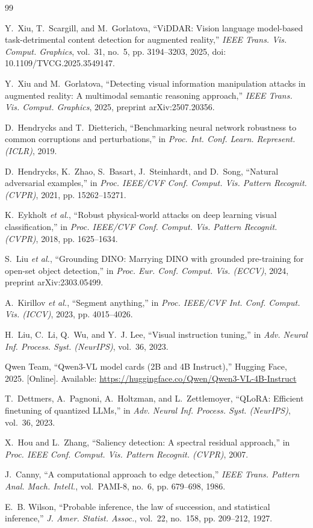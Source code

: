 \documentclass[journal,onecolumn]{IEEEtran}
\begin{document}
\begin{thebibliography}{99}

Y.~Xiu, T.~Scargill, and M.~Gorlatova, ``{ViDDAR}: Vision language model-based task-detrimental
content detection for augmented reality,'' \emph{IEEE Trans. Vis. Comput. Graphics}, vol.~31, no.~5,
pp. 3194--3203, 2025, doi: 10.1109/TVCG.2025.3549147.

Y.~Xiu and M.~Gorlatova, ``Detecting visual information manipulation attacks in augmented reality: A
multimodal semantic reasoning approach,'' \emph{IEEE Trans. Vis. Comput. Graphics}, 2025, preprint
arXiv:2507.20356.

D.~Hendrycks and T.~Dietterich, ``Benchmarking neural network robustness to common corruptions and
perturbations,'' in \emph{Proc. Int. Conf. Learn. Represent. (ICLR)}, 2019.

D.~Hendrycks, K.~Zhao, S.~Basart, J.~Steinhardt, and D.~Song, ``Natural adversarial examples,'' in
\emph{Proc. IEEE/CVF Conf. Comput. Vis. Pattern Recognit. (CVPR)}, 2021, pp. 15262--15271.

K.~Eykholt \emph{et al.}, ``Robust physical-world attacks on deep learning visual classification,''
in \emph{Proc. IEEE/CVF Conf. Comput. Vis. Pattern Recognit. (CVPR)}, 2018, pp. 1625--1634.

S.~Liu \emph{et al.}, ``Grounding {DINO}: Marrying {DINO} with grounded pre-training for open-set
object detection,'' in \emph{Proc. Eur. Conf. Comput. Vis. (ECCV)}, 2024, preprint arXiv:2303.05499.

A.~Kirillov \emph{et al.}, ``Segment anything,'' in \emph{Proc. IEEE/CVF Int. Conf. Comput. Vis.
(ICCV)}, 2023, pp. 4015--4026.

H.~Liu, C.~Li, Q.~Wu, and Y.~J. Lee, ``Visual instruction tuning,'' in \emph{Adv. Neural Inf.
Process. Syst. (NeurIPS)}, vol.~36, 2023.

Qwen Team, ``{Qwen3-VL} model cards (2B and 4B Instruct),'' Hugging Face, 2025. [Online]. Available:
\url{https://huggingface.co/Qwen/Qwen3-VL-4B-Instruct}

T.~Dettmers, A.~Pagnoni, A.~Holtzman, and L.~Zettlemoyer, ``{QLoRA}: Efficient finetuning of
quantized {LLMs},'' in \emph{Adv. Neural Inf. Process. Syst. (NeurIPS)}, vol.~36, 2023.

X.~Hou and L.~Zhang, ``Saliency detection: A spectral residual approach,'' in \emph{Proc. IEEE Conf.
Comput. Vis. Pattern Recognit. (CVPR)}, 2007.

J.~Canny, ``A computational approach to edge detection,'' \emph{IEEE Trans. Pattern Anal. Mach.
Intell.}, vol.~PAMI-8, no.~6, pp. 679--698, 1986.

E.~B. Wilson, ``Probable inference, the law of succession, and statistical inference,'' \emph{J. Amer.
Statist. Assoc.}, vol.~22, no.~158, pp. 209--212, 1927.

\end{thebibliography}
\end{document}

